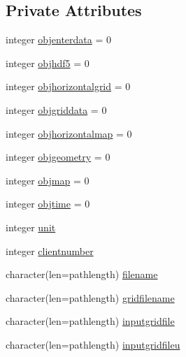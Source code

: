 \subsection*{Private Attributes}
\begin{DoxyCompactItemize}
\item 
integer \mbox{\hyperlink{structmodulemercatorformat_1_1t__mercatorformat_af5f8f95b23f27ec85b2b21f6ca09480b}{objenterdata}} = 0
\item 
integer \mbox{\hyperlink{structmodulemercatorformat_1_1t__mercatorformat_a592ee458fdabbb79c2a667c3d3a75645}{objhdf5}} = 0
\item 
integer \mbox{\hyperlink{structmodulemercatorformat_1_1t__mercatorformat_a3e77a8105ba76924a692516413a20b31}{objhorizontalgrid}} = 0
\item 
integer \mbox{\hyperlink{structmodulemercatorformat_1_1t__mercatorformat_a49091aa6882a27216c776d695f95eaeb}{objgriddata}} = 0
\item 
integer \mbox{\hyperlink{structmodulemercatorformat_1_1t__mercatorformat_acf9aa0c6693d2f7b9cd2cc70f0258e44}{objhorizontalmap}} = 0
\item 
integer \mbox{\hyperlink{structmodulemercatorformat_1_1t__mercatorformat_ab3033909f1a23f4e2455b59bd54144e4}{objgeometry}} = 0
\item 
integer \mbox{\hyperlink{structmodulemercatorformat_1_1t__mercatorformat_ab1ba80b2d4a17663d48931553926ea73}{objmap}} = 0
\item 
integer \mbox{\hyperlink{structmodulemercatorformat_1_1t__mercatorformat_ac61206fd6feaa2cc6f88f624f65b2069}{objtime}} = 0
\item 
integer \mbox{\hyperlink{structmodulemercatorformat_1_1t__mercatorformat_ab0174bb72fae420b134e47d4173d0bce}{unit}}
\item 
integer \mbox{\hyperlink{structmodulemercatorformat_1_1t__mercatorformat_a1b94ddf52626eea347b6b10db3611f85}{clientnumber}}
\item 
character(len=pathlength) \mbox{\hyperlink{structmodulemercatorformat_1_1t__mercatorformat_ac6659a3d39d88e6810d3d385fc81234d}{filename}}
\item 
character(len=pathlength) \mbox{\hyperlink{structmodulemercatorformat_1_1t__mercatorformat_ae2c40810e40cdceae0db8d3cb589c1e8}{gridfilename}}
\item 
character(len=pathlength) \mbox{\hyperlink{structmodulemercatorformat_1_1t__mercatorformat_af58e1a3123fb10cc630f28f728ac5f5d}{inputgridfile}}
\item 
character(len=pathlength) \mbox{\hyperlink{structmodulemercatorformat_1_1t__mercatorformat_aee9bd521fa5ceb042c1d4f4b96956a10}{inputgridfileu}}

\end{DoxyCompactItemize}
